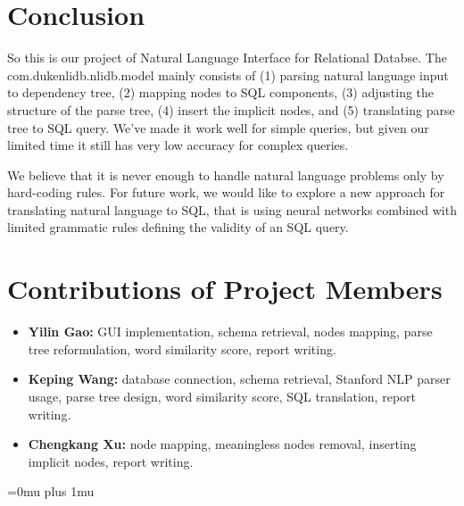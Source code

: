 \documentclass[twocolumn]{article}
\begin{document}
\section{Conclusion}
So this is our project of Natural Language Interface for Relational Databse. The com.dukenlidb.nlidb.model mainly consists of (1) parsing natural language input to dependency tree, (2) mapping nodes to SQL components, (3) adjusting the structure of the parse tree, (4) insert the implicit nodes, and (5) translating parse tree to SQL query. We've made it work well for simple queries, but given our limited time it still has very low accuracy for complex queries.

We believe that it is never enough to handle natural language problems only by hard-coding rules. For future work, we would like to explore a new approach for translating natural language to SQL, that is using neural networks combined with limited grammatic rules defining the validity of an SQL query. 


\section{Contributions of Project Members}

\begin{itemize}
\item {\bf Yilin Gao:} GUI implementation, schema retrieval, nodes mapping, parse tree reformulation, word similarity score, report writing.
\item {\bf Keping Wang:} database connection, schema retrieval, Stanford NLP parser usage, parse tree design, word similarity score, SQL translation, report writing.
\item {\bf Chengkang Xu:} node mapping, meaningless nodes removal, inserting implicit nodes, report writing.
\end{itemize}


\Urlmuskip=0mu plus 1mu\relax


\end{document}
